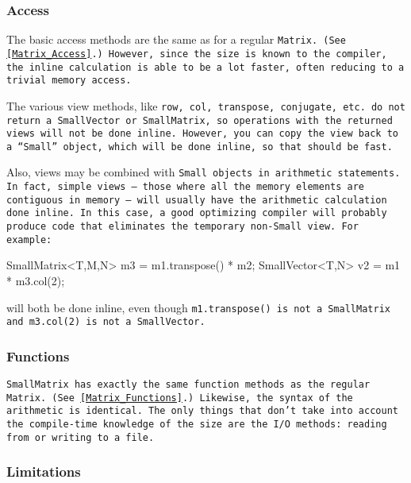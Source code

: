 \subsubsection{Access}
\label{SmallMatrix_Access}

The basic access methods are the same as for a regular \tt{Matrix}.
(See \ref{Matrix_Access}.)
However, since the size is known to the compiler, the inline calculation is able
to be a lot faster, often reducing to a trivial memory access.

The various view methods, like \tt{row}, \tt{col}, \tt{transpose}, \tt{conjugate}, etc. 
do not return a \tt{SmallVector} or \tt{SmallMatrix}, so operations 
with the returned views will not be done inline.
However, you can copy the view back to a ``\tt{Small}'' object, which will be done 
inline, so that should be fast.

Also, views may be combined with \tt{Small} objects in arithmetic statements.
In fact, simple views -- those where all the memory 
elements are contiguous in memory -- will usually have the arithmetic calculation
done inline.
In this case, a good optimizing compiler will probably produce code that 
eliminates the temporary
non-\tt{Small} view.  For example:
\begin{tmvcode}
SmallMatrix<T,M,N> m3 = m1.transpose() * m2;
SmallVector<T,N> v2 = m1 * m3.col(2);
\end{tmvcode}
will both be done inline, even though \tt{m1.transpose()} is not a \tt{SmallMatrix} and
\tt{m3.col(2)} is not a \tt{SmallVector}.

\subsubsection{Functions}
\label{SmallMatrix_Functions}

\tt{SmallMatrix} has exactly the same function methods as the regular \tt{Matrix}.  
(See \ref{Matrix_Functions}.) Likewise, the syntax of the arithmetic is identical. 
The only things that don't take into account the compile-time knowledge of the size are the I/O methods: reading from or writing to a file.

\subsubsection{Limitations}
\label{SmallMatrix_Limitations}

